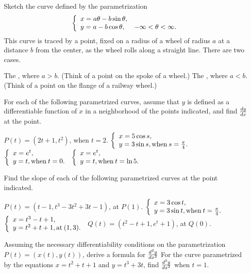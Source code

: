 \begin{exercises}
Sketch the curve defined by the parametrization
\[
\left\{ \begin{array}{ll} x=a\theta - b\sin\theta, \\ y=a-b\cos\theta, & -\infty < \theta < \infty. \end{array} \right.
\]
This curve is traced by a point, fixed on a
radius of a wheel of radius $a$ at a
distance $b$ from the center, as the wheel
rolls along a straight line.
There are two cases.
\begin{exenum}
\x
The , where $a>b$.
(Think of a point on the spoke of a wheel.)
\x
The , where $a<b$.
(Think of a point on the flange of a railway wheel.)
\end{exenum}

For each of the following parametrized curves,
assume that $y$ is defined as a differentiable
function of $x$ in a neighborhood of the points
indicated, and find $\frac{d y}{d x}$ at the point.
\begin{exenum}
\x
$P(t) = (2t+1, t^2)$, when $t=2$.
\x
$\left\{ \begin{array}{ll} x=5 \cos s, \\ y=3 \sin s, \mbox{when} \: s = \frac{\pi}4. \end{array} \right.$
\x
$\left\{ \begin{array}{ll} x=e^t, \\ y=t, \mbox{when} \: t=0. \end{array} \right.$
\x
$\left\{ \begin{array}{ll} x=e^t, \\ y=t, \mbox{when} \: t = \ln 5. \end{array} \right.$
\end{exenum}

Find the slope of each of the following
parametrized curves at the point indicated.
\begin{exenum}
\x
$P(t) = (t-1, t^3-3t^2+3t-1)$, at $P(1)$.
\x
$\left\{ \begin{array}{ll} x=3 \cos t, \\ y=3 \sin t, \mbox{when} \: t = \frac{\pi}4. \end{array} \right.$
\x
$\left\{ \begin{array}{ll} x = t^3 - t + 1, \\ y = t^2 + t +1, \mbox{at} \: (1, 3). \end{array} \right.$
\x
$Q(t) = (t^2 - t + 1, e^t + 1)$, at $Q(0)$.
\end{exenum}

\begin{exenum}
\x
Assuming the necessary differentiability
conditions on the parametrization
$P(t) = (x(t), y(t))$, derive a formula for
$\frac{d^{2}{y}}{dx^{2}}$
\x
For the curve parametrized by the equations
$x = t^2 + t + 1$ and $y = t^3 + 3t$,
find $\frac{d^{2}{y}}{dx^{2}}$ when $t=1$.
\end{exenum}

\end{exercises}
